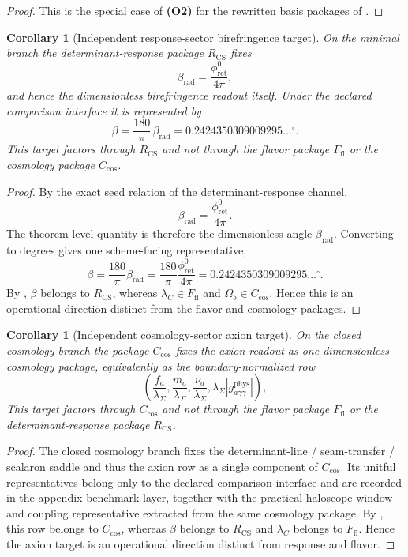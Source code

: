 \documentclass[11pt,a4paper]{article}
\newtheorem{corollary}[theorem]{Corollary}
\theoremstyle{definition}
\theoremstyle{remark}
\begin{document}
\begin{proof}
This is the special case of \textbf{(O2)} for the rewritten basis packages of
.
\end{proof}

\begin{corollary}[Independent response-sector birefringence target]
\label{cor:response-birefringence-target}
On the minimal branch the determinant-response package $R_{\mathrm{CS}}$ fixes
\[
\beta_{\mathrm{rad}}=\frac{\phi_{\mathrm{ret}}^0}{4\pi},
\]
and hence the dimensionless birefringence readout itself. Under the declared comparison interface it
is represented by
\[
\beta
=
\frac{180}{\pi}\,\beta_{\mathrm{rad}}
=
0.2424350309009295\ldots^\circ.
\]
This target factors through $R_{\mathrm{CS}}$ and not through the flavor package
$F_{\mathrm{fl}}$ or the cosmology package $C_{\mathrm{cos}}$.
\end{corollary}

\begin{proof}
By the exact seed relation of the determinant-response channel,
\[
\beta_{\mathrm{rad}}=\frac{\phi_{\mathrm{ret}}^0}{4\pi}.
\]
The theorem-level quantity is therefore the dimensionless angle $\beta_{\mathrm{rad}}$. Converting
to degrees gives one scheme-facing representative,
\[
\beta=\frac{180}{\pi}\beta_{\mathrm{rad}}
=
\frac{180}{\pi}\frac{\phi_{\mathrm{ret}}^0}{4\pi}
=
0.2424350309009295\ldots^\circ.
\]
By , $\beta$ belongs to $R_{\mathrm{CS}}$, whereas
$\lambda_C\in F_{\mathrm{fl}}$ and $\Omega_b\in C_{\mathrm{cos}}$. Hence this is an operational
direction distinct from the flavor and cosmology packages.
\end{proof}

\begin{corollary}[Independent cosmology-sector axion target]
\label{cor:cosmology-axion-target}
On the closed cosmology branch the package $C_{\mathrm{cos}}$ fixes the axion readout as one
dimensionless cosmology package, equivalently as the boundary-normalized row
\[
\left(
\frac{f_a}{\lambda_\Sigma},
\frac{m_a}{\lambda_\Sigma},
\frac{\nu_a}{\lambda_\Sigma},
\lambda_\Sigma\left|g_{a\gamma\gamma}^{\mathrm{phys}}\right|
\right),
\]
This target factors through $C_{\mathrm{cos}}$ and not through the flavor package
$F_{\mathrm{fl}}$ or the determinant-response package $R_{\mathrm{CS}}$.
\end{corollary}

\begin{proof}
The closed cosmology branch fixes the determinant-line / seam-transfer / scalaron saddle and thus
the axion row as a single component of $C_{\mathrm{cos}}$. Its unitful representatives belong only
to the declared comparison interface and are recorded in the appendix benchmark layer, together with
the practical haloscope window and coupling representative extracted from the same cosmology
package.
By , this row belongs to $C_{\mathrm{cos}}$, whereas $\beta$ belongs
to $R_{\mathrm{CS}}$ and $\lambda_C$ belongs to $F_{\mathrm{fl}}$. Hence the axion target is an
operational direction distinct from response and flavor.
\end{proof}
\end{document}
